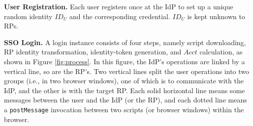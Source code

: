 
\noindent\textbf{User Registration.}
Each user registers once at the IdP to set up a unique random identity $ID_U$ and the corresponding credential. $ID_U$ is kept unknown to RPs.


\noindent\textbf{SSO Login.} A login instance %
consists of four steps, namely script downloading, RP identity transformation,
identity-token generation, and $Acct$ calculation, as shown in Figure \ref{fig:process}.
In this figure,
    the IdP's operations are linked by a vertical line,
        so are the RP's.
Two vertical lines split the user operations into two groups (i.e., in two browser windows),
    one of which is to communicate with the IdP,
                 and the other is with the target RP.
Each solid horizontal line means some messages between the user and the IdP (or the RP),
            and each dotted line means a \verb+postMessage+ invocation between two scripts (or browser windows) within the browser.



